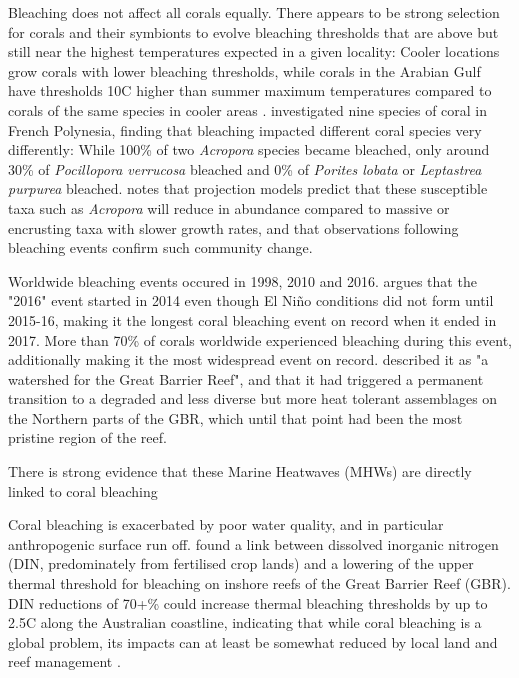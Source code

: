 \documentclass[11pt,a4paper]{article}
\begin{document}
Bleaching does not affect all corals equally. There appears to be strong selection for corals and their symbionts to evolve bleaching thresholds that are above but still near the highest temperatures expected in a given locality: Cooler locations grow corals with lower bleaching thresholds, while corals in the Arabian Gulf have thresholds 10\textdegree C higher than summer maximum temperatures compared to corals of the same species in cooler areas \citep{Hughes2003}. \cite{Hughes2003} investigated nine species of coral in French Polynesia, finding that bleaching impacted different coral species very differently: While 100\% of two \textit{Acropora} species became bleached, only around 30\% of \textit{Pocillopora verrucosa} bleached and 0\% of \textit{Porites lobata} or \textit{Leptastrea purpurea} bleached. \cite{Pandolfi2011} notes that projection models predict that these susceptible taxa such as \textit{Acropora} will reduce in abundance compared to massive or encrusting taxa with slower growth rates, and that observations following bleaching events confirm such community change. 

Worldwide bleaching events occured in 1998, 2010 and 2016.  \cite{Eakin2016} argues that the "2016" event started in 2014 even though El Ni\~{n}o conditions did not form until 2015-16, making it the longest coral bleaching event on record when it ended in 2017.  More than 70\% of corals worldwide experienced bleaching during this event, additionally making it the most widespread event on record. \cite{Hughes2018b} described it as "a watershed for the Great Barrier Reef", and that it had triggered a permanent transition to a degraded and less diverse but more heat tolerant assemblages on the Northern parts of the GBR, which until that point had been the most pristine region of the reef. 

There is strong evidence that these Marine Heatwaves (MHWs) are directly linked to coral bleaching \citep{Eakin2016,Hughes2018a,Hughes2018b}

Coral bleaching is exacerbated by poor water quality, and in particular anthropogenic surface run off. \cite{Wooldridge2009} found a link between dissolved inorganic nitrogen (DIN, predominately from fertilised crop lands) and a lowering of the upper thermal threshold for bleaching on inshore reefs of the Great Barrier Reef (GBR). DIN reductions of 70+\% could increase thermal bleaching thresholds by up to 2.5\textdegree C along the Australian coastline, indicating that while coral bleaching is a global problem, its impacts can at least be somewhat reduced by local land and reef management \cite{Wooldridge2009}.
\end{document}
